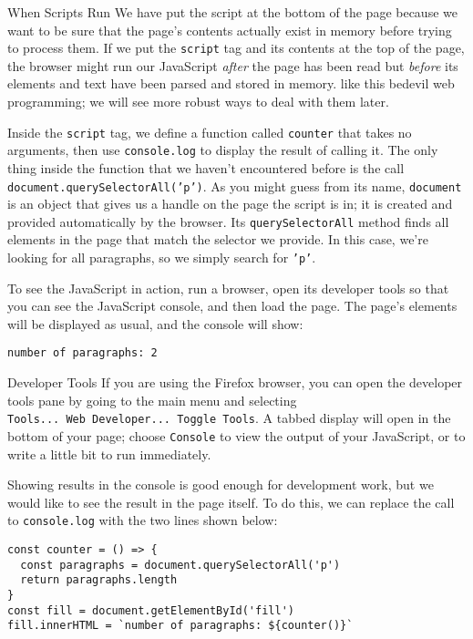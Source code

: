 \begin{aside}{When Scripts Run}
  We have put the script at the bottom of the page
  because we want to be sure that the page's contents actually exist in memory
  before trying to process them.
  If we put the \texttt{script} tag and its contents at the top of the page,
  the browser might run our JavaScript \emph{after} the page has been read
  but \emph{before} its elements and text have been parsed and stored in memory.
   like this bedevil web programming;
  we will see more robust ways to deal with them later.
\end{aside}

Inside the \texttt{script} tag,
we define a function called \texttt{counter} that takes no arguments,
then use \texttt{console.log} to display the result of calling it.
The only thing inside the function that we haven't encountered before
is the call \texttt{document.querySelectorAll('p')}.
As you might guess from its name,
\texttt{document} is an object that gives us a handle on the page the script is in;
it is created and provided automatically by the browser.
Its \texttt{querySelectorAll} method finds all elements in the page
that match the selector we provide.
In this case,
we're looking for all paragraphs,
so we simply search for \texttt{'p'}.

To see the JavaScript in action,
run a browser,
open its developer tools so that you can see the JavaScript console,
and then load the page.
The page's elements will be displayed as usual,
and the console will show:

\begin{verbatim}
number of paragraphs: 2
\end{verbatim}

\begin{aside}{Developer Tools}
  If you are using the Firefox browser,
  you can open the developer tools pane by going to the main menu
  and selecting \texttt{Tools...\ Web\ Developer...\ Toggle\ Tools}.
  A tabbed display will open in the bottom of your page;
  choose \texttt{Console} to view the output of your JavaScript,
  or to write a little bit to run immediately.
\end{aside}

Showing results in the console is good enough for development work,
but we would like to see the result in the page itself.
To do this,
we can replace the call to \texttt{console.log} with the two lines shown below:

\begin{verbatim}
const counter = () => {
  const paragraphs = document.querySelectorAll('p')
  return paragraphs.length
}
const fill = document.getElementById('fill')
fill.innerHTML = `number of paragraphs: ${counter()}`
\end{verbatim}

